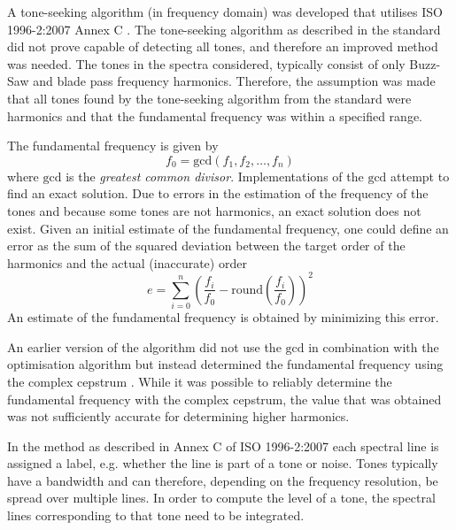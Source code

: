A tone-seeking algorithm (in frequency domain) was developed \cite{Rietdijk2016}
that utilises ISO 1996-2:2007 Annex C \cite{ISO1996-2_2007}. The tone-seeking
algorithm as described in the standard did not prove capable of detecting all
tones, and therefore an improved method was needed. The tones in the spectra
considered, typically consist of only Buzz-Saw and blade pass frequency
harmonics. Therefore, the assumption was made that all tones found by the
tone-seeking algorithm from the standard were harmonics and that the fundamental
frequency was within a specified range.

The fundamental frequency is given by
\begin{equation}
 f_{0} = \mathrm{gcd}\left(f_1, f_2, \dots, f_n \right)
\end{equation}
where $\mathrm{gcd}$ is the \emph{greatest common divisor}.
Implementations of the $\mathrm{gcd}$ attempt to find an exact solution.
Due to errors in the estimation of the frequency of the tones and because some tones are
not harmonics, an exact solution does not exist. Given an initial estimate of
the fundamental frequency, one could define an error as the sum of the squared
deviation between the target order of the harmonics and the actual (inaccurate)
order
\begin{equation}
 e = \sum_{i=0}^{n} \left( \frac{f_i}{f_0} - \mathrm{round}\left(\frac{f_i}{f_0}\right) \right)^2
\end{equation}
An estimate of the fundamental frequency is obtained by minimizing this error.

An earlier version of the algorithm did not use the $\mathrm{gcd}$ in
combination with the optimisation algorithm but instead determined the
fundamental frequency using the complex cepstrum \cite{Rietdijk2015}.
While it was possible to reliably determine the fundamental frequency with the
complex cepstrum, the value that was obtained was not sufficiently accurate
for determining higher harmonics.

In the method as described in Annex C of ISO 1996-2:2007 each spectral line is
assigned a label, e.g. whether the line is part of a tone or noise. Tones typically
have a bandwidth and can therefore, depending on the frequency resolution, be spread over multiple lines.
In order to compute the level of a tone, the spectral lines corresponding to that tone need to be integrated.

